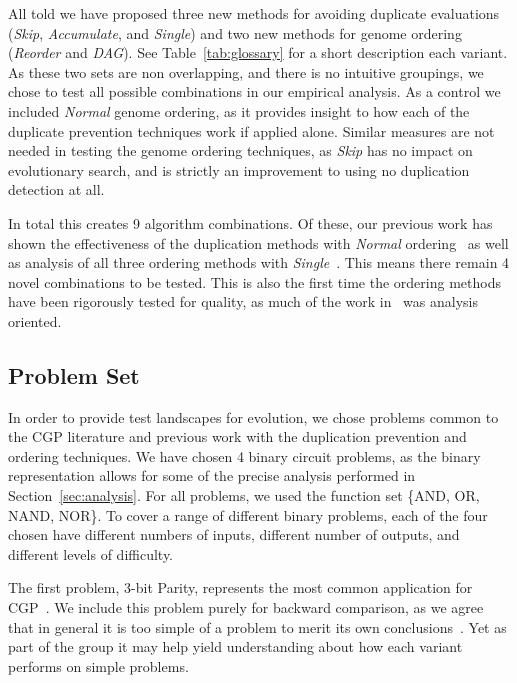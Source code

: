 \documentclass[journal]{IEEEtran}
\begin{document}
All told we have proposed three new methods for avoiding duplicate evaluations
(\emph{Skip}, \emph{Accumulate}, and \emph{Single}) and two new methods for
genome ordering (\emph{Reorder} and \emph{DAG}).
See Table~\ref{tab:glossary} for a short description each variant.
As these two
sets are non overlapping, and there is no intuitive groupings, we chose to test
all possible combinations in our empirical analysis.  As a control we included \emph{Normal} genome ordering,
as it provides insight to how each of the duplicate prevention techniques work
if applied alone.  Similar measures are not needed in testing the genome ordering techniques,
as \emph{Skip} has no impact on evolutionary search, and is strictly an improvement
to using no duplication detection at all.

In total this creates 9 algorithm combinations.  Of these, our previous work
has shown the effectiveness of the duplication methods with \emph{Normal} ordering~\cite{goldman:2013:cgpwaste}
as well as analysis of all three ordering methods with \emph{Single}~\cite{goldman:2013:ordering}.
This means there remain 4 novel combinations to be tested.
This is also the first time the ordering methods
have been rigorously tested for quality, as much of the work in~\cite{goldman:2013:ordering}
was analysis oriented.

\subsection{Problem Set}
In order to provide test landscapes for evolution, we chose problems common to
the CGP literature and previous work with the duplication prevention and ordering
techniques.  We have chosen 4 binary circuit problems, as the binary representation
allows for some of the precise analysis performed in Section~\ref{sec:analysis}.
For all problems, we used the function set \{AND, OR, NAND, NOR\}.
To cover a range of different binary problems, each of the four chosen have
different numbers of inputs, different number of outputs, and different levels
of difficulty.

The first problem, 3-bit Parity, represents the most
common application for
CGP~\cite{yu:2001:neutrality,miller:2006:redundancy,walker:2008:cgpmodules}.
We include this problem purely for backward comparison, as we agree that in general
it is too simple of a problem to merit its own conclusions~\cite{white:2013:bgpb}.
Yet as part of the group it may help yield understanding about how each variant
performs on simple problems.
\end{document}
